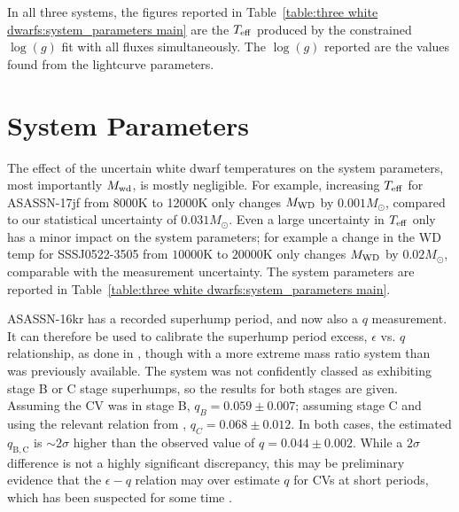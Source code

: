 In all three systems, the figures reported in Table~\ref{table:three white dwarfs:system_parameters main} are the $T_{\rm eff}$ produced by the constrained $\log (g)$ fit with all fluxes simultaneously.
The $\log (g)$ reported are the values found from the lightcurve parameters.


\section{System Parameters}
\label{sect:system parameters}

The effect of the uncertain white dwarf temperatures on the system parameters, most importantly $M_{\rm wd}$, is mostly negligible. For example, increasing $T_{\rm eff}$ for ASASSN-17jf from 8000K to 12000K only changes $M_{\rm WD}$ by $0.001M_\odot$, compared to our statistical uncertainty of $0.031 M_\odot$. Even a large uncertainty in $T_{\rm eff}$ only has a minor impact on the system parameters; for example a change in the WD temp for SSSJ0522-3505 from $10000$K to $20000$K only changes $M_{\rm WD}$ by $0.02 M_\odot$, comparable with the measurement uncertainty. The system parameters are reported in Table~\ref{table:three white dwarfs:system_parameters main}.

ASASSN-16kr has a recorded superhump period, and now also a $q$ measurement. It can therefore be used to calibrate the superhump period excess, $\epsilon$ vs. $q$ relationship, as done in \citet{McAllister2019}, though with a more extreme mass ratio system than was previously available. The system was not confidently classed as exhibiting stage B or C stage superhumps, so the results for both stages are given. Assuming the CV was in stage B, $q_B = 0.059\pm0.007$; assuming stage C and using the relevant relation from \citet{McAllister2019}, $q_C = 0.068\pm0.012$. In both cases, the estimated $q_\mathrm{B,C}$ is $\sim 2 \sigma$ higher than the observed value of $q = 0.044\pm0.002$. While a $2 \sigma$ difference is not a highly significant discrepancy, this may be preliminary evidence that the $\epsilon - q$ relation may over estimate $q$ for CVs at short periods, which has been suspected for some time \citep{pearson2007, knigge11}.


